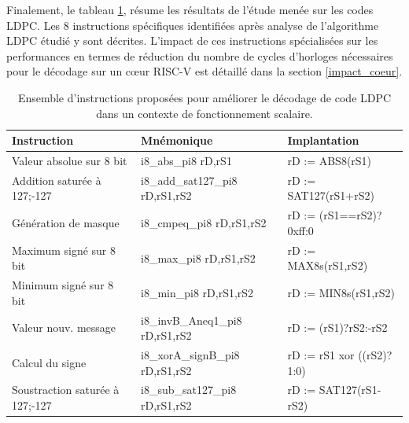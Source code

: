 \documentclass[../main.tex]{subfiles}
\begin{document}
Finalement, le tableau \ref{tab:instr_ldpc}, résume les résultats de l'étude menée sur les codes LDPC. Les 8 instructions spécifiques identifiées après analyse de l'algorithme LDPC étudié y sont décrites. L'impact de ces instructions spécialisées sur les performances en termes de réduction du nombre de cycles d'horloges nécessaires pour le décodage sur un cœur RISC-V est détaillé dans la section \ref{impact_coeur}. 
\begin{table}[!tb]
\footnotesize
\centering
\begin{tabular}{ l || l l }
\hline
\textbf{Instruction}            & \textbf{Mnémonique}              & \textbf{Implantation} \\
\hline
Valeur absolue sur 8 bit        & i8\_abs\_pi8 rD,rS1              & rD := ABS8(rS1)   \\ 
Addition saturée à 127;-127     & i8\_add\_sat127\_pi8 rD,rS1,rS2  & rD := SAT127(rS1+rS2)   \\ 
Génération de masque            & i8\_cmpeq\_pi8 rD,rS1,rS2        & rD := (rS1==rS2)?0xff:0   \\ 
Maximum signé sur 8 bit         & i8\_max\_pi8 rD,rS1,rS2          & rD := MAX8s(rS1,rS2)  \\ 
Minimum signé sur 8 bit         & i8\_min\_pi8 rD,rS1,rS2          & rD := MIN8s(rS1,rS2) \\ 
Valeur nouv. message            & i8\_invB\_Aneq1\_pi8 rD,rS1,rS2  & rD := (rS1\geqslant1)?rS2:-rS2 \\ 
Calcul du signe                 & i8\_xorA\_signB\_pi8 rD,rS1,rS2  & rD := rS1 xor ((rS2\geqslant0)?1:0) \\
Soustraction saturée à 127;-127 & i8\_sub\_sat127\_pi8 rD,rS1,rS2  & rD := SAT127(rS1-rS2) \\ 
\hline
\end{tabular}
\caption{Ensemble d'instructions proposées pour améliorer le décodage de code LDPC dans un contexte de fonctionnement scalaire.}
\label{tab:instr_ldpc}
\end{table}
%
%
%
%
\end{document}
